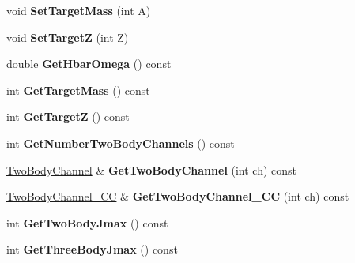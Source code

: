 \begin{DoxyCompactItemize}
\item 
\hypertarget{classModelSpace_ab29013a1b7b4b8b26d5905f97c135931}{void {\bfseries Set\-Target\-Mass} (int A)}\label{classModelSpace_ab29013a1b7b4b8b26d5905f97c135931}

\item 
\hypertarget{classModelSpace_a7ad596c6f8c6c850672e1699b12901e4}{void {\bfseries Set\-Target\-Z} (int Z)}\label{classModelSpace_a7ad596c6f8c6c850672e1699b12901e4}

\item 
\hypertarget{classModelSpace_a4cf15b20d8262cdab4ab1cadd412de7f}{double {\bfseries Get\-Hbar\-Omega} () const }\label{classModelSpace_a4cf15b20d8262cdab4ab1cadd412de7f}

\item 
\hypertarget{classModelSpace_a2f6a8428767c064a63796d4fc010e41e}{int {\bfseries Get\-Target\-Mass} () const }\label{classModelSpace_a2f6a8428767c064a63796d4fc010e41e}

\item 
\hypertarget{classModelSpace_ac467562b5c207d25cddc71c4da6a702b}{int {\bfseries Get\-Target\-Z} () const }\label{classModelSpace_ac467562b5c207d25cddc71c4da6a702b}

\item 
\hypertarget{classModelSpace_a7c0b9152d68e069f9774078bd2a429b7}{int {\bfseries Get\-Number\-Two\-Body\-Channels} () const }\label{classModelSpace_a7c0b9152d68e069f9774078bd2a429b7}

\item 
\hypertarget{classModelSpace_ab2c315fd347fe93dd63246dea3d02f35}{\hyperlink{classTwoBodyChannel}{Two\-Body\-Channel} \& {\bfseries Get\-Two\-Body\-Channel} (int ch) const }\label{classModelSpace_ab2c315fd347fe93dd63246dea3d02f35}

\item 
\hypertarget{classModelSpace_a6709279838180ef0a6745320c9ad6926}{\hyperlink{classTwoBodyChannel__CC}{Two\-Body\-Channel\-\_\-\-C\-C} \& {\bfseries Get\-Two\-Body\-Channel\-\_\-\-C\-C} (int ch) const }\label{classModelSpace_a6709279838180ef0a6745320c9ad6926}

\item 
\hypertarget{classModelSpace_a3cbf323130388fae05fed1b59c5bac90}{int {\bfseries Get\-Two\-Body\-Jmax} () const }\label{classModelSpace_a3cbf323130388fae05fed1b59c5bac90}

\item 
\hypertarget{classModelSpace_a23ec9e8797755abfc0986b2e2c73a056}{int {\bfseries Get\-Three\-Body\-Jmax} () const }\label{classModelSpace_a23ec9e8797755abfc0986b2e2c73a056}


\end{DoxyCompactItemize}
